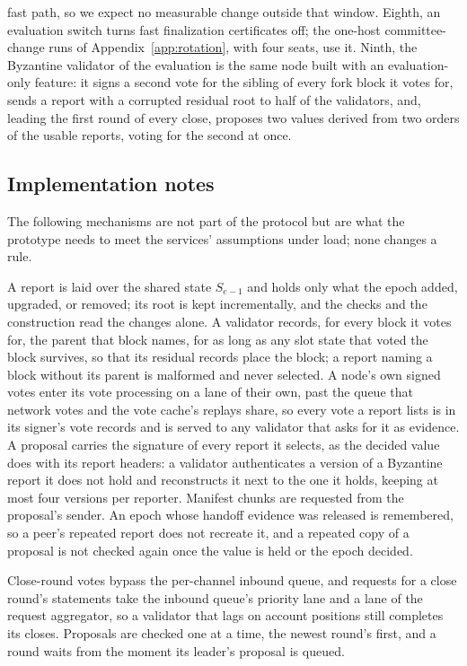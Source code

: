 \documentclass[conference]{IEEEtran}
\begin{document}
fast path, so we expect no measurable change outside that window. Eighth, an evaluation switch turns fast finalization certificates off; the one-host committee-change runs of Appendix~\ref{app:rotation}, with four seats, use it. Ninth, the Byzantine validator of the evaluation is the same node built with an evaluation-only feature: it signs a second vote for the sibling of every fork block it votes for, sends a report with a corrupted residual root to half of the validators, and, leading the first round of every close, proposes two values derived from two orders of the usable reports, voting for the second at once.

\subsection{Implementation notes}
\label{app:impl}
The following mechanisms are not part of the protocol but are what the prototype needs to meet the services' assumptions under load; none changes a rule.

 A report is laid over the shared state $S_{e-1}$ and holds only what the epoch added, upgraded, or removed; its root is kept incrementally, and the checks and the construction read the changes alone. A validator records, for every block it votes for, the parent that block names, for as long as any slot state that voted the block survives, so that its residual records place the block; a report naming a block without its parent is malformed and never selected. A node's own signed votes enter its vote processing on a lane of their own, past the queue that network votes and the vote cache's replays share, so every vote a report lists is in its signer's vote records and is served to any validator that asks for it as evidence. A proposal carries the signature of every report it selects, as the decided value does with its report headers: a validator authenticates a version of a Byzantine report it does not hold and reconstructs it next to the one it holds, keeping at most four versions per reporter. Manifest chunks are requested from the proposal's sender. An epoch whose handoff evidence was released is remembered, so a peer's repeated report does not recreate it, and a repeated copy of a proposal is not checked again once the value is held or the epoch decided.

 Close-round votes bypass the per-channel inbound queue, and requests for a close round's statements take the inbound queue's priority lane and a lane of the request aggregator, so a validator that lags on account positions still completes its closes. Proposals are checked one at a time, the newest round's first, and a round waits from the moment its leader's proposal is queued.
\end{document}
